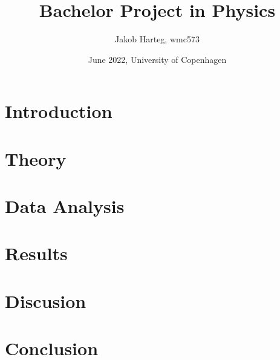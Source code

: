 \documentclass{article}
\title{Bachelor Project in Physics}
\author{Jakob Harteg, wmc573}
\date{June 2022, University of Copenhagen}
\begin{document}
\maketitle


\newpage


\section{Introduction}
 

\section{Theory}
 

\section{Data Analysis}
 

\section{Results}
%  

\section{Discusion}
%  

\section{Conclusion}
%  

\newpage
\nocite{*}


\end{document}
